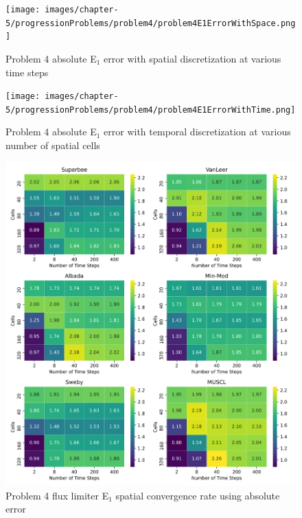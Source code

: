 \clearpage

\begin{figure}[p]
    \centering
    \texttt{[image: images/chapter-5/progressionProblems/problem4/problem4E1ErrorWithSpace.png]}
    \caption{Problem 4 absolute E${}_{1}$ error with spatial discretization at various time steps }
    \label{fig:problem4_l1error_spatial_results}
\end{figure}

\clearpage

\begin{figure}[p]
    \centering
    \texttt{[image: images/chapter-5/progressionProblems/problem4/problem4E1ErrorWithTime.png]}
    \caption{Problem 4 absolute E${}_{1}$ error with temporal discretization at various number of spatial cells}
    \label{fig:problem4_l1error_time_results}
\end{figure}

\clearpage

\begin{figure}[p]
    \centering
    \includegraphics[width=6in]{images/chapter-5/progressionProblems/problem4/problem4E1FluxLimiterConvergenceRate.png}
    \caption{Problem 4 flux limiter E${}_{1}$ spatial convergence rate using absolute error}
    \label{fig:problem4_l1error_fluxlimiter_convergence_rate}
\end{figure}

